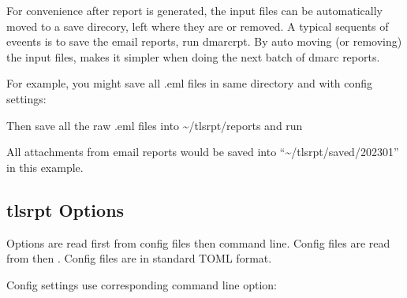 \documentclass[letterpaper,10pt,english]{sphinxmanual}
\begin{document}
\sphinxAtStartPar
For convenience after report is generated, the input files can be automatically moved to a save
direcory, left where they are or removed. A typical sequents of eveents is to save
the email reports, run dmarc\sphinxhyphen{}rpt.  By auto moving (or removing) the input files, makes it simpler
when doing the next batch of dmarc reports.

\sphinxAtStartPar
For example, you might save all .eml files in same directory and with config settings:

\begin{sphinxVerbatim}[commandchars=\\\{\}]
  
  
  
\end{sphinxVerbatim}

\sphinxAtStartPar
Then save all the raw .eml files into \textasciitilde{}/tlsrpt/reports and run

\begin{sphinxVerbatim}[commandchars=\\\{\}]
\end{sphinxVerbatim}

\sphinxAtStartPar
All attachments from email reports would be saved into “\textasciitilde{}/tlsrpt/saved/2023\sphinxhyphen{}01”
in this example.


\subsection{tls\sphinxhyphen{}rpt Options}
\label{\detokenize{Readme-TLS:tls-rpt-options}}
\sphinxAtStartPar
Options are read first from config files then command line. Config files are read
from  then .  Config files
are in standard TOML format.

\sphinxAtStartPar
Config settings use corresponding command line option:

\begin{sphinxVerbatim}[commandchars=\\\{\}]
  
\end{sphinxVerbatim}
\end{document}
